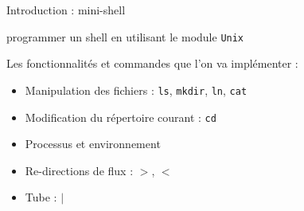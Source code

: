 \begin{frame}{Introduction : mini-shell}

     programmer un shell en utilisant le module \texttt{Unix} 
    
    
    Les fonctionnalités et commandes que l'on va implémenter :
    \begin{itemize}[label=\small{}]
        \item<1-> Manipulation des fichiers : \texttt{ls}, \texttt{mkdir}, \texttt{ln}, \texttt{cat}
        \item<1-> Modification du répertoire courant : \texttt{cd}
        \item<1-> Processus et environnement %
        \item<1-> Re-directions de flux :  $>$, $<$
        \item<1-> Tube : $|$

    \end{itemize}
\end{frame}
